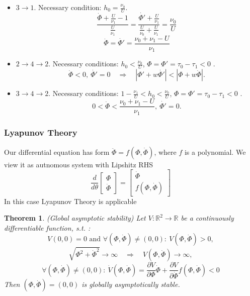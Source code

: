 \documentclass[12pt]{article}
\newtheorem{theorem}{Theorem}
\begin{document}
\begin{itemize}
	\item $3 \to 1$. Necessary condition: $h_0 = \frac{\nu_0}{U}$.
$$ \frac{ \dot{\Phi} + \frac{U}{\nu_1} - 1}{\frac{U}{\nu_1}} = \frac{\dot{\Phi'} + \frac{U}{\nu_1}}{\frac{U}{\nu_0} + \frac{U}{\nu_1}} = \frac{\nu_0}{U} $$
$$ \dot{\Phi}= \dot{\Phi'} = \frac{\nu_0 + \nu_1 - U}{\nu_1}$$


	\item $ 2 \to 4 \to 2$. Necessary conditions: $h_0 < \frac{\nu_0}{U}$, $\Phi = \Phi' = \tau_0 -\tau_1 < 0 $ .
	\\
	$$ \dot{\Phi} < 0 , ~\dot{\Phi'} = 0 \quad \Rightarrow \quad |\Phi' + w\dot{\Phi'}| < |\Phi + w\dot{\Phi}| . $$

\item $ 3 \to 4 \to 2$. Necessary conditions: $ 1 - \frac{\nu_1}{U} < h_0 < \frac{\nu_0}{U}$, $\Phi = \Phi' = \tau_0 -\tau_1 < 0 $ .
	\\
	$$ 0 < \dot{\Phi} < \frac{\nu_0 + \nu_1 - U}{\nu_1} , ~\dot{\Phi'} = 0 . $$


\end{itemize}

\subsubsection*{Lyapunov Theory}
Our differential equation has form $ \ddot{\Phi} = f(\Phi, \dot{\Phi})$, where $f$ is a polynomial. We view it as autnomous system with Lipshitz RHS
$$  \frac{d}{d\theta} \begin{bmatrix} \Phi \\ \dot{\Phi} \end{bmatrix} = \begin{bmatrix} \dot{\Phi} \\ f(\Phi, \dot{\Phi}) \end{bmatrix} $$
In this case Lyapunov Theory is applicable
\begin{theorem}(Global asymptotic stability) 
Let $V: \mathbb{R}^2 \to \mathbb{R}$ be a continuously differentiable function, s.t. :
$$V(0,0) = 0 \text{ and } \forall (\Phi, \dot{\Phi}) \neq (0, 0): ~V(\Phi, \dot{\Phi}) > 0  , $$
$$ \sqrt{\Phi^2 + \dot{\Phi}^2 } \to \infty \quad \Rightarrow \quad V(\Phi, \dot{\Phi}) \to \infty, $$
$$ \forall (\Phi, \dot{\Phi}) \neq (0, 0):  ~\dot{V}(\Phi, \dot{\Phi}) = \frac{\partial V}{\partial \Phi} \dot{\Phi} + \frac{\partial V}{\partial \dot{\Phi}} f(\Phi, \dot{\Phi}) < 0 $$
Then $(\Phi, \dot{\Phi}) = (0, 0)$ is globally asymptotically stable.
\end{theorem}
\end{document}
